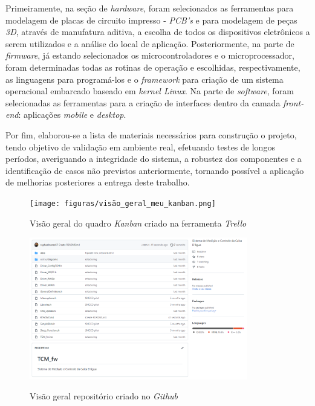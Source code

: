 Primeiramente, na seção de \textit{hardware}, foram selecionados as ferramentas para modelagem de placas de circuito impresso - \textit{PCB's} e para modelagem de peças \textit{3D}, através de manufatura aditiva, a escolha de todos os dispositivos eletrônicos a serem utilizados e a análise do local de aplicação. Posteriormente, na parte de \textit{firmware}, já estando selecionados os microcontroladores e o microprocessador, foram determinadas todas as rotinas de operação e escolhidas, respectivamente, as linguagens para programá-los e o \textit{framework} para criação de um sistema operacional embarcado baseado em \textit{kernel Linux}. Na parte de \textit{software}, foram selecionadas as ferramentas para a criação de interfaces dentro da camada \textit{front-end}: aplicações \textit{mobile} e \textit{desktop}.

Por fim, elaborou-se a lista de materiais necessários para construção o projeto, tendo objetivo de validação em ambiente real, efetuando testes de longos períodos, averiguando a integridade do sistema, a robustez dos componentes e a identificação de casos não previstos anteriormente, tornando possível a aplicação de melhorias posteriores a entrega deste trabalho.

\begin{figure}[H]
	\centering
	\caption{Visão geral do quadro \textit{Kanban} criado na ferramenta \textit{Trello}}
	\texttt{[image: figuras/visão\_geral\_meu\_kanban.png]}
	\label{fig:kanban-proj}
\end{figure}


\begin{figure}[H]
	\centering
	\caption{Visão geral repositório criado no \textit{Github}}
	\includegraphics[width=0.85\textwidth]{figuras/github.png}
	\label{fig:github}
\end{figure}



